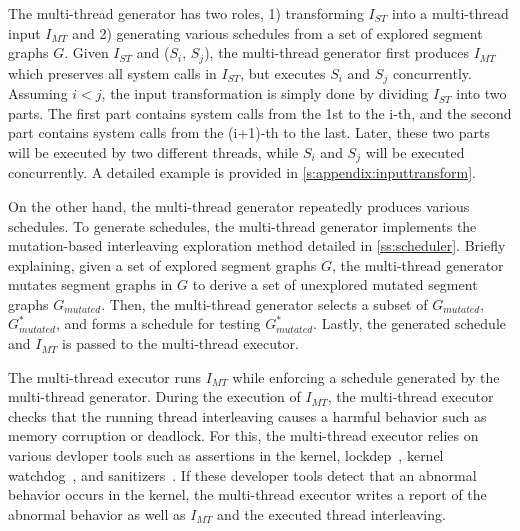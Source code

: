 %
%
%
%
%
The multi-thread generator has two roles, 1) transforming $I_{ST}$
into a multi-thread input $I_{MT}$ and 2) generating various
schedules from a set of explored segment graphs $G$.
%
%   
Given $I_{ST}$ and ($S_i$, $S_j$), the multi-thread generator first
produces $I_{MT}$ which preserves all system calls in $I_{ST}$, but
executes $S_i$ and $S_j$ concurrently.
%
Assuming $i < j$, the input transformation is simply done by dividing
$I_{ST}$ into two parts.
%
The first part contains system calls from the 1st to the i-th, and the
second part contains system calls from the (i+1)-th to the last.
%
Later, these two parts will be executed by two different threads,
while $S_i$ and $S_j$ will be executed concurrently. A detailed
example is provided in \autoref{s:appendix:inputtransform}.



On the other hand, the multi-thread generator repeatedly produces
various schedules.
%
To generate schedules, the multi-thread generator implements the
mutation-based interleaving exploration method detailed in
\autoref{ss:scheduler}.
%
Briefly explaining, given a set of explored segment graphs $G$, the
multi-thread generator mutates segment graphs in $G$ to derive a set
of unexplored mutated segment graphs $G_{mutated}$.
%
Then, the multi-thread generator selects a subset of $G_{mutated}$,
$G^{*}_{mutated}$, and forms a schedule for testing $G^*_{mutated}$.
%
Lastly, the generated schedule and $I_{MT}$ is passed to the
multi-thread executor.






%
The multi-thread executor runs $I_{MT}$ while enforcing a schedule
generated by the multi-thread generator.
%
During the execution of $I_{MT}$, the multi-thread executor checks
that the running thread interleaving causes a harmful behavior such as
memory corruption or deadlock.
%
For this, the multi-thread executor relies on various devloper tools
such as assertions in the kernel, lockdep~\cite{lockdep}, kernel
watchdog~\cite{watchdog}, and sanitizers~\cite{kasan, ubsan, asan}.
%
If these developer tools detect that an abnormal behavior occurs in
the kernel, the multi-thread executor writes a report of the abnormal
behavior as well as $I_{MT}$ and the executed thread interleaving.







